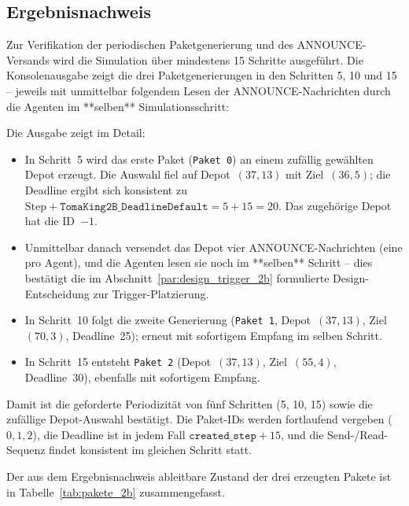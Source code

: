 
\subsection{Ergebnisnachweis}
\label{sssec:paketgenerierung_2b_nachweis}

Zur Verifikation der periodischen Paketgenerierung und des ANNOUNCE-Versands wird die Simulation über mindestens 15 Schritte ausgeführt. Die Konsolenausgabe zeigt die drei Paketgenerierungen in den Schritten 5, 10 und 15 -- jeweils mit unmittelbar folgendem Lesen der ANNOUNCE-Nachrichten durch die Agenten im **selben** Simulationsschritt:



Die Ausgabe zeigt im Detail:
\begin{itemize}
    \item In Schritt~5 wird das erste Paket (\texttt{Paket 0}) an einem zufällig gewählten Depot erzeugt. Die Auswahl fiel auf Depot~\((37, 13)\) mit Ziel~\((36, 5)\); die Deadline ergibt sich konsistent zu \(\text{Step} + \texttt{TomaKing2B\_DeadlineDefault} = 5 + 15 = 20\). Das zugehörige Depot hat die ID~\(-1\).
    \item Unmittelbar danach versendet das Depot vier ANNOUNCE-Nachrichten (eine pro Agent), und die Agenten lesen sie noch im **selben** Schritt -- dies bestätigt die im Abschnitt~\ref{par:design_trigger_2b} formulierte Design-Entscheidung zur Trigger-Platzierung.
    \item In Schritt~10 folgt die zweite Generierung (\texttt{Paket 1}, Depot~\((37, 13)\), Ziel~\((70, 3)\), Deadline~25); erneut mit sofortigem Empfang im selben Schritt.
    \item In Schritt~15 entsteht \texttt{Paket 2} (Depot~\((37, 13)\), Ziel~\((55, 4)\), Deadline~30), ebenfalls mit sofortigem Empfang.
\end{itemize}

Damit ist die geforderte Periodizität von fünf Schritten (5, 10, 15) sowie die zufällige Depot-Auswahl bestätigt. Die Paket-IDs werden fortlaufend vergeben (\(0, 1, 2\)), die Deadline ist in jedem Fall \(\texttt{created\_step} + 15\), und die Send-/Read-Sequenz findet konsistent im gleichen Schritt statt.

Der aus dem Ergebnisnachweis ableitbare Zustand der drei erzeugten Pakete ist in Tabelle~\ref{tab:pakete_2b} zusammengefasst.


